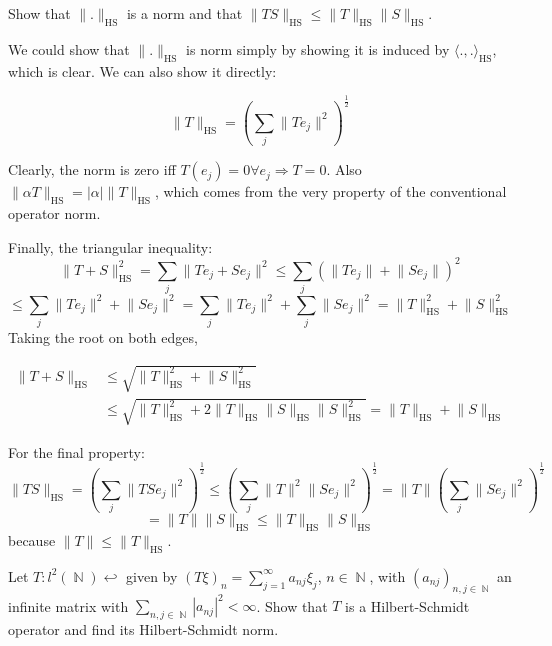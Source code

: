 \documentclass{article}
\theoremstyle{exercisestyle}
\newenvironment{exercise}[1]
  {\renewcommand\theinnerex{#1}\innerex}
  {\endinnerex}
\DeclareMathOperator{\Natural}{\mathbb{N}}
\DeclareMathOperator{\hs}{\text{HS}}
\newcommand{\norm}[1]{\lVert #1 \rVert}
\newcommand{\inner}[2]{\langle #1, #2 \rangle}
\begin{document}
\begin{exercise}{1.4.5}
    Show that $\norm{.}_{\hs}$ is a norm and that $\norm{TS}_{\hs} \leq \norm{T}_{\hs} \norm{S}_{\hs}$.

    We could show that $\norm{.}_{\hs}$ is norm simply by showing it is induced by $\inner{.}{.}_{\hs}$, which is clear. We can also show it directly:

    $$ \norm{T}_{\hs} = \left(\sum_j \norm{T e_j}^2\right)^{\frac{1}{2}}$$

    Clearly, the norm is zero iff $T(e_j) = 0 \forall e_j \Rightarrow T = 0$. Also $\norm{\alpha T}_{\hs} = |\alpha|\norm{T}_{\hs}$,
    which comes from the very property of the conventional operator norm.

    Finally, the triangular inequality:
    $$ \norm{T + S}^2_{\hs} = \sum_j \norm{T e_j + S e_j}^2 \leq \sum_j \left(\norm{T e_j} + \norm{S e_j}\right)^2$$
    $$ \leq \sum_j \norm{T e_j}^2 + \norm{S e_j}^2 = \sum_j \norm{T e_j}^2 + \sum_j \norm{S e_j}^2 = \norm{T}_{\hs}^2 + \norm{S}_{\hs}^2 $$
    Taking the root on both edges,

    \begin{align}
        \norm{T+S}_{\hs} & \leq  \sqrt{\norm{T}_{\hs}^2 + \norm{S}_{\hs}^2}                              \\
                         & \leq \sqrt{\norm{T}_{\hs}^2 + 2\norm{T}_{\hs}\norm{S}_{\hs} \norm{S}_{\hs}^2}
        = \norm{T}_{\hs} + \norm{S}_{\hs}
    \end{align}


    For the final property:
    $$ \norm{TS}_{\hs} = \left(\sum_j \norm{TS e_j}^2\right)^{\frac{1}{2}} \leq  \left(\sum_j\norm{T}^2\norm{S e_j}^2\right)^{\frac{1}{2}}
        = \norm{T} \left(\sum_j \norm{S e_j}^2\right)^\frac{1}{2}$$
    $$ = \norm{T}\norm{S}_{\hs} \leq \norm{T}_{\hs}\norm{S}_{\hs}$$
    because $\norm{T} \leq \norm{T}_{\hs}$.

\end{exercise}

\begin{exercise}{1.4.7}
    Let $T : l^2(\Natural) \hookleftarrow$ given by $(T \xi)_n = \sum_{j=1}^\infty a_{nj} \xi_j$, $n \in \Natural$, with $(a_{nj})_{n,j\in\Natural}$
    an infinite matrix with $\sum_{n,j\in\Natural} |a_{nj}|^2 < \infty$. Show that $T$ is a Hilbert-Schmidt operator and find its Hilbert-Schmidt norm.

\end{exercise}

\begin{exercise}{1.4.11}

\end{exercise}
\end{document}
